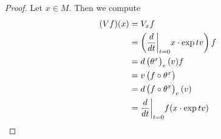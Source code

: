 \begin{proof}
	Let $x \in M$. Then we compute
	\begin{align*}
		(Vf)(x) &= V_xf\\
		&= \del[3]{\frac{d}{dt}\bigg\vert_{t = 0} x \cdot \exp tv}f\\
		&= d\del[1]{\theta^x}_e(v)f\\
		&= v\del[1]{f \circ \theta^x}\\
		&= d\del[1]{f \circ \theta^x}_e(v)\\
		&= \frac{d}{dt}\bigg\vert_{t = 0} f(x \cdot \exp tv)
	\end{align*}
\end{proof}

\begin{definition}
	
\end{definition}
